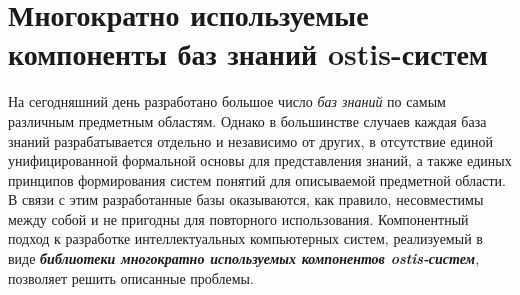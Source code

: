 \section{Многократно используемые компоненты баз знаний ostis-систем}
\label{ostis_library_knowledge_base}

На сегодняшний день разработано большое число \textit{баз знаний} по самым различным предметным областям. Однако в большинстве случаев каждая база знаний разрабатывается отдельно и независимо от других, в отсутствие единой унифицированной формальной основы для представления знаний, а также единых принципов формирования систем понятий для описываемой предметной области. В связи с этим разработанные базы оказываются, как правило, несовместимы между собой и не пригодны для повторного использования. Компонентный подход к разработке интеллектуальных компьютерных систем, реализуемый в виде \textbf{\textit{библиотеки многократно используемых компонентов ostis-систем}}, позволяет решить описанные проблемы.

%